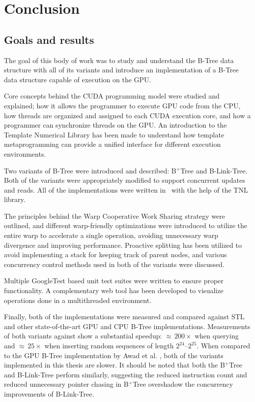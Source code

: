\chapter{Conclusion}\label{chapter:conclusion}

\section{Goals and results}
The goal of this body of work was to study and understand the B-Tree data structure with all of its variants and introduce an implementation of a B-Tree data structure capable of execution on the GPU.

Core concepts behind the CUDA programming model were studied and explained; how it allows the programmer to execute GPU code from the CPU, how threads are organized and assigned to each CUDA execution core, and how a programmer can synchronize threads on the GPU. An introduction to the Template Numerical Library has been made to understand how template metaprogramming can provide a unified interface for different execution environments.

Two variants of B-Tree were introduced and described: B$^+$Tree and B-Link-Tree. Both of the variants were appropriately modified to support concurrent updates and reads. All of the implementations were written in \CC\ with the help of the TNL library.

The principles behind the Warp Cooperative Work Sharing strategy were outlined, and different warp-friendly optimizations were introduced to utilize the entire warp to accelerate a single operation, avoiding unnecessary warp divergence and improving performance. Proactive splitting has been utilized to avoid implementing a stack for keeping track of parent nodes, and various concurrency control methods used in both of the variants were discussed.

Multiple GoogleTest based unit test suites were written to ensure proper functionality. A complementary web tool has been developed to visualize operations done in a multithreaded environment.

Finally, both of the implementations were measured and compared against STL and other state-of-the-art GPU and CPU B-Tree implementations. Measurements of both variants against  show a substantial speedup: $\approx$\,$200\times$ when querying and $\approx$\,$25\times$ when inserting random sequences of length $2^{24}$--$2^{25}$. When compared to the GPU B-Tree implementation by Awad et al. \cite{awad}, both of the variants implemented in this thesis are slower. It should be noted that both the B$^+$Tree and B-Link-Tree perform similarly, suggesting the reduced instruction count and reduced unnecessary pointer chasing in B$^+$Tree overshadow the concurrency improvements of B-Link-Tree.

